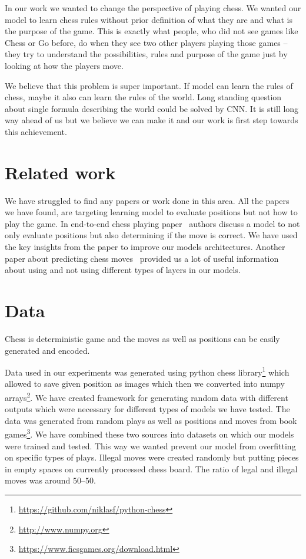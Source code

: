 \documentclass[10pt,twocolumn,letterpaper]{article}
\begin{document}
In our work we wanted to change the perspective of playing chess. We wanted our
model to learn chess rules without prior definition of what they are and what is
the purpose of the game. This is exactly what people, who did not see games like
Chess or Go before, do when they see two other players playing those games --
they try to understand the possibilities, rules and purpose of the game just by
looking at how the players move.

We believe that this problem is super important. If model can learn the rules of
chess, maybe it also can learn the rules of the world. Long standing question
about single formula describing the world could be solved by CNN. It is still
long way ahead of us but we believe we can make it and our work is first step
towards this achievement.

\section{Related work}

We have struggled to find any papers or work done in this area. All the papers
we have found, are targeting learning model to evaluate positions but not how to
play the game. In end-to-end chess playing paper~\cite{DeepChess} authors
discuss a model to not only evaluate positions but also determining if the move
is correct. We have used the key insights from the paper to improve our models
architectures. Another paper about predicting chess
moves~\cite{Oshri2015PredictingMI} provided us a lot of useful information about
using and not using different types of layers in our models.

\section{Data}

Chess is deterministic game and the moves as well as positions can be easily
generated and encoded.

Data used in our experiments was generated using python chess
library\footnote{\url{https://github.com/niklasf/python-chess}} which allowed to
save given position as images which then we converted into numpy
arrays\footnote{\url{http://www.numpy.org}}. We have created framework for
generating random data with different outputs which were necessary for different
types of models we have tested. The data was generated from random plays as well
as positions and moves from book
games\footnote{\url{https://www.ficsgames.org/download.html}}. We have combined
these two sources into datasets on which our models were trained and tested.
This way we wanted prevent our model from overfitting on specific types of
plays. Illegal moves were created randomly but putting pieces in empty spaces on
currently processed chess board. The ratio of legal and illegal moves was around
$50$--$50$.
\end{document}
